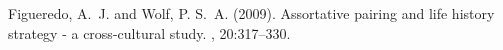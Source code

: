 \documentclass[twoside]{article}
\begin{document}
\begin{multicols}{2}
\begin{enumerate}
\end{enumerate} 


\begin{thebibliography}{99} %

Figueredo, A.~J. and Wolf, P. S.~A. (2009).
\newblock Assortative pairing and life history strategy - a cross-cultural
  study.
, 20:317--330.
 
\end{thebibliography}


\end{multicols}
\end{document}
